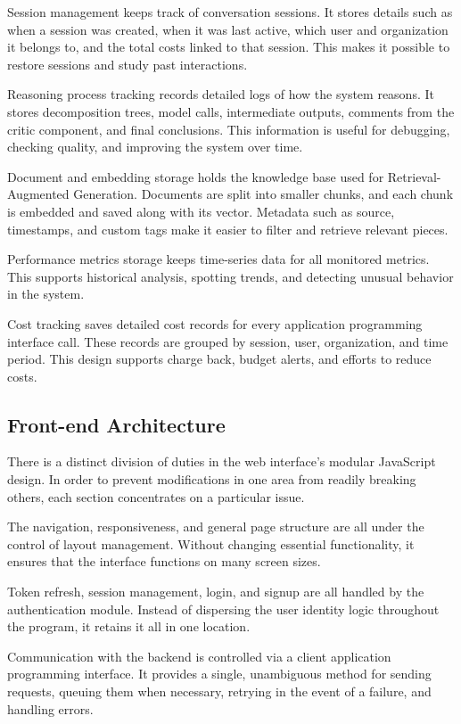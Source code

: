 \documentclass[final,5p,times,twocolumn,authoryear,draft]{elsarticle}
\begin{document}
Session management keeps track of conversation sessions. It stores details such as when a session was created, when it was last active, which user and organization it belongs to, and the total costs linked to that session. This makes it possible to restore sessions and study past interactions.

Reasoning process tracking records detailed logs of how the system reasons. It stores decomposition trees, model calls, intermediate outputs, comments from the critic component, and final conclusions. This information is useful for debugging, checking quality, and improving the system over time.

Document and embedding storage holds the knowledge base used for Retrieval-Augmented Generation. Documents are split into smaller chunks, and each chunk is embedded and saved along with its vector. Metadata such as source, timestamps, and custom tags make it easier to filter and retrieve relevant pieces.

Performance metrics storage keeps time-series data for all monitored metrics. This supports historical analysis, spotting trends, and detecting unusual behavior in the system.

Cost tracking saves detailed cost records for every application programming interface call. These records are grouped by session, user, organization, and time period. This design supports charge back, budget alerts, and efforts to reduce costs.

\subsection{Front-end Architecture}

There is a distinct division of duties in the web interface's modular JavaScript design. In order to prevent modifications in one area from readily breaking others, each section concentrates on a particular issue.

The navigation, responsiveness, and general page structure are all under the control of layout management. Without changing essential functionality, it ensures that the interface functions on many screen sizes.

Token refresh, session management, login, and signup are all handled by the authentication module. Instead of dispersing the user identity logic throughout the program, it retains it all in one location.

Communication with the backend is controlled via a client application programming interface. It provides a single, unambiguous method for sending requests, queuing them when necessary, retrying in the event of a failure, and handling errors.
\end{document}
